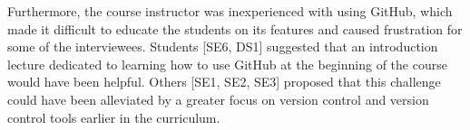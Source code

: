 Furthermore, the course instructor was inexperienced with using GitHub, which made it difficult to educate the students on its features and caused frustration for some of the interviewees. Students [SE6, DS1] suggested that an introduction lecture dedicated to learning how to use GitHub at the beginning of the course would have been helpful. Others [SE1, SE2, SE3] proposed that this challenge could have been alleviated by a greater focus on version control and version control tools earlier in the curriculum.




